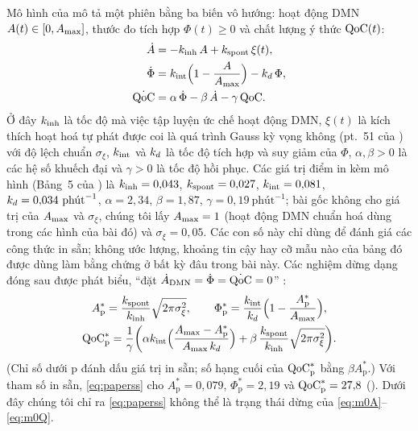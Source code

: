 Mô hình của \citet[pt.~52--54]{BQI} mô tả một phiên bằng ba biến vô hướng: hoạt động DMN $A(t)\in[0,A_{\max}]$, thước đo tích hợp $\Phi(t)\ge 0$ và chất lượng ý thức $\mathrm{QoC}(t)$:
\begin{align}
  \dot A    &= -k_{\mathrm{inh}}\,A + k_{\mathrm{spont}}\,\xi(t), \label{eq:m0A}\\
  \dot \Phi &= k_{\mathrm{int}}\Bigl(1-\frac{A}{A_{\max}}\Bigr) - k_{d}\,\Phi, \label{eq:m0Phi}\\
  \dot{\mathrm{QoC}} &= \alpha\,\dot\Phi - \beta\,\dot A - \gamma\,\mathrm{QoC}. \label{eq:m0Q}
\end{align}
Ở đây $k_{\mathrm{inh}}$ là tốc độ mà việc tập luyện ức chế hoạt động DMN, $\xi(t)$ là kích thích hoạt hoá tự phát được coi là quá trình Gauss kỳ vọng không (pt.~51 của \citealp{BQI}) với độ lệch chuẩn $\sigma_\xi$, $k_{\mathrm{int}}$ và $k_{d}$ là tốc độ tích hợp và suy giảm của $\Phi$, $\alpha,\beta>0$ là các hệ số khuếch đại và $\gamma>0$ là tốc độ hồi phục. Các giá trị điểm in kèm mô hình (Bảng~5 của \citealp{BQI}) là $k_{\mathrm{inh}}=0{,}043$, $k_{\mathrm{spont}}=0{,}027$, $k_{\mathrm{int}}=0{,}081$, $k_{d}=0{,}034\ \text{phút}^{-1}$, $\alpha=2{,}34$, $\beta=1{,}87$, $\gamma=0{,}19\ \text{phút}^{-1}$; bài gốc không cho giá trị của $A_{\max}$ và $\sigma_\xi$, chúng tôi lấy $A_{\max}=1$ (hoạt động DMN chuẩn hoá dùng trong các hình của bài đó) và $\sigma_\xi=0{,}05$. Các con số này chỉ dùng để đánh giá các công thức in sẵn; không ước lượng, khoảng tin cậy hay cỡ mẫu nào của bảng đó được dùng làm bằng chứng ở bất kỳ đâu trong bài này. Các nghiệm dừng dạng đóng sau được phát biểu, ``đặt $\dot A_{\mathrm{DMN}}=\dot\Phi=\dot{\mathrm{QoC}}=0$'' \citep[pt.~55--57]{BQI}:
\begin{equation}
\begin{gathered}
  A^*_{\mathrm{p}}=\frac{k_{\mathrm{spont}}}{k_{\mathrm{inh}}}\sqrt{2\pi\sigma_\xi^2},\qquad
  \Phi^*_{\mathrm{p}}=\frac{k_{\mathrm{int}}}{k_{d}}\Bigl(1-\frac{A^*_{\mathrm{p}}}{A_{\max}}\Bigr),\\
  \mathrm{QoC}^*_{\mathrm{p}}=\frac{1}{\gamma}\biggl(\alpha k_{\mathrm{int}}\Bigl(\frac{A_{\max}-A^*_{\mathrm{p}}}{A_{\max}\,k_{d}}\Bigr)+\beta\,\frac{k_{\mathrm{spont}}}{k_{\mathrm{inh}}}\sqrt{2\pi\sigma_\xi^2}\biggr).
\end{gathered}
  \label{eq:paperss}
\end{equation}
(Chỉ số dưới p đánh dấu giá trị in sẵn; số hạng cuối của $\mathrm{QoC}^*_{\mathrm p}$ bằng $\beta A^*_{\mathrm p}$.)
Với tham số in sẵn, \eqref{eq:paperss} cho $A^*_{\mathrm p}=0{,}079$, $\Phi^*_{\mathrm p}=2{,}19$ và $\mathrm{QoC}^*_{\mathrm p}=27{,}8$ (). Dưới đây chúng tôi chỉ ra \eqref{eq:paperss} không thể là trạng thái dừng của \eqref{eq:m0A}--\eqref{eq:m0Q}.

